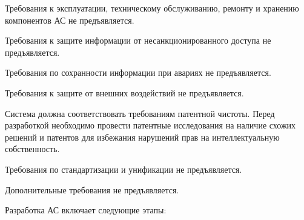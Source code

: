 
Требования к эксплуатации, техническому обслуживанию,
ремонту и хранению компонентов АС не предъявляется.


Требования к защите информации от несанкционированного доступа
не предъявляется.


Требования по сохранности информации при авариях не предъявляется.


Требования к защите от внешних воздействий не предъявляется.


Система должна соответствовать требованиям патентной чистоты.
Перед разработкой необходимо провести патентные исследования
на наличие схожих решений и патентов
для избежания нарушений прав на интеллектуальную собственность.


Требования по стандартизации и унификации не предъявляется.


Дополнительные требования не предъявляется.


Разработка АС включает следующие этапы:

